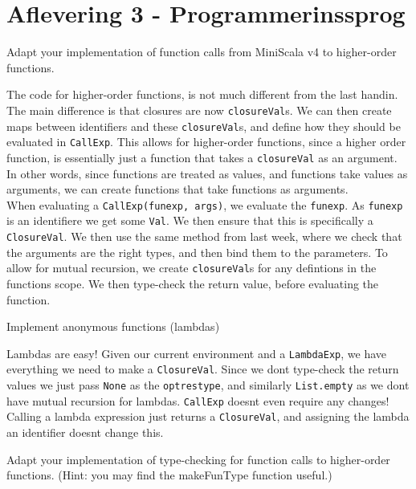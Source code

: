 \documentclass[working, oneside]{../../../Preambles/tuftebook}
\begin{document}
\let\cleardoublepage\clearpage
\thispagestyle{fancy}
\chapter{Aflevering 3 - Programmerinssprog}
\begin{exercise}[67 - a]
Adapt your implementation of function calls from MiniScala v4 to higher-order functions.
\end{exercise}
\begin{solution}
    The code for higher-order functions, is not much different from the last handin. The main difference is that closures are now \texttt{closureVal}s. We can then create maps between identifiers and these \texttt{closureVal}s, and define how they should be evaluated in \texttt{CallExp}. This allows for higher-order functions, since a higher order function, is essentially just a function that takes a \texttt{closureVal} as an argument. In other words, since functions are treated as values, and functions take values as arguments, we can create functions that take functions as arguments.\\
When evaluating a \texttt{CallExp(funexp, args)}, we evaluate the \texttt{funexp}. As \texttt{funexp} is an identifiere we get some \texttt{Val}. We then ensure that this is specifically a \texttt{ClosureVal}. We then use the same method from last week, where we check that the arguments are the right types, and then bind them to the parameters. To allow for mutual recursion, we create \texttt{closureVal}s for any defintions in the functions scope. We then type-check the return value, before evaluating the function.
\end{solution}
\begin{exercise}[67 - b]
Implement anonymous functions (lambdas)
\end{exercise}
\begin{solution}
Lambdas are easy! Given our current environment and a \texttt{LambdaExp}, we have everything we need to make a \texttt{ClosureVal}. Since we dont type-check the return values we just pass \texttt{None} as the \texttt{optrestype}, and similarly \texttt{List.empty} as we dont have mutual recursion for lambdas.  \texttt{CallExp} doesnt even require any changes! Calling a lambda expression just returns a \texttt{ClosureVal}, and assigning the lambda an identifier doesnt change this.
\end{solution}
\begin{exercise}[68 - a]
Adapt your implementation of type-checking for function calls to higher-order functions. (Hint: you may find the makeFunType function useful.)
\end{exercise}
\end{document}
